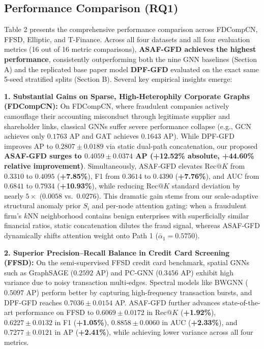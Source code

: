 \documentclass[10pt,a4paper,twocolumn]{article}
\begin{document}
\subsection{Performance Comparison (RQ1)}

Table 2 presents the comprehensive performance comparison across FDCompCN, FFSD, Elliptic, and T-Finance. Across all four datasets and all four evaluation metrics (16 out of 16 metric comparisons), \textbf{ASAF-GFD achieves the highest performance}, consistently outperforming both the nine GNN baselines (Section A) and the replicated base paper model \textbf{DPF-GFD} evaluated on the exact same 5-seed stratified splits (Section B). Several key empirical insights emerge:

\textbf{1. Substantial Gains on Sparse, High-Heterophily Corporate Graphs (FDCompCN):} On FDCompCN, where fraudulent companies actively camouflage their accounting misconduct through legitimate supplier and shareholder links, classical GNNs suffer severe performance collapse (e.g., GCN achieves only $0.1763$ AP and GAT achieves $0.1643$ AP). While DPF-GFD improves AP to $0.2807 \pm 0.0189$ via static dual-path concatenation, our proposed \textbf{ASAF-GFD surges to $0.4059 \pm 0.0374$ AP (+12.52\% absolute, +44.60\% relative improvement)}. Simultaneously, ASAF-GFD elevates $\text{Rec}@K$ from $0.3310$ to $\mathbf{0.4095}$ (\textbf{+7.85\%}), F1 from $0.3614$ to $\mathbf{0.4390}$ (\textbf{+7.76\%}), and AUC from $0.6841$ to $\mathbf{0.7934}$ (\textbf{+10.93\%}), while reducing $\text{Rec}@K$ standard deviation by nearly $5\times$ ($0.0058$ vs.\ $0.0276$). This dramatic gain stems from our scale-adaptive structural anomaly prior $S_i$ and per-node attention gating: when a fraudulent firm's $k$NN neighborhood contains benign enterprises with superficially similar financial ratios, static concatenation dilutes the fraud signal, whereas ASAF-GFD dynamically shifts attention weight onto Path 1 ($\bar{\alpha}_1 = 0.5750$).

\textbf{2. Superior Precision--Recall Balance in Credit Card Screening (FFSD):} On the semi-supervised FFSD credit card benchmark, spatial GNNs such as GraphSAGE ($0.2592$ AP) and PC-GNN ($0.3456$ AP) exhibit high variance due to noisy transaction multi-edges. Spectral models like BWGNN ($0.5097$ AP) perform better by capturing high-frequency transaction bursts, and DPF-GFD reaches $0.7036 \pm 0.0154$ AP. ASAF-GFD further advances state-of-the-art performance on FFSD to $\mathbf{0.6069 \pm 0.0172}$ in $\text{Rec}@K$ (\textbf{+1.92\%}), $\mathbf{0.6227 \pm 0.0132}$ in F1 (\textbf{+1.05\%}), $\mathbf{0.8858 \pm 0.0060}$ in AUC (\textbf{+2.33\%}), and $\mathbf{0.7277 \pm 0.0121}$ in AP (\textbf{+2.41\%}), while achieving lower variance across all four metrics.
\end{document}
